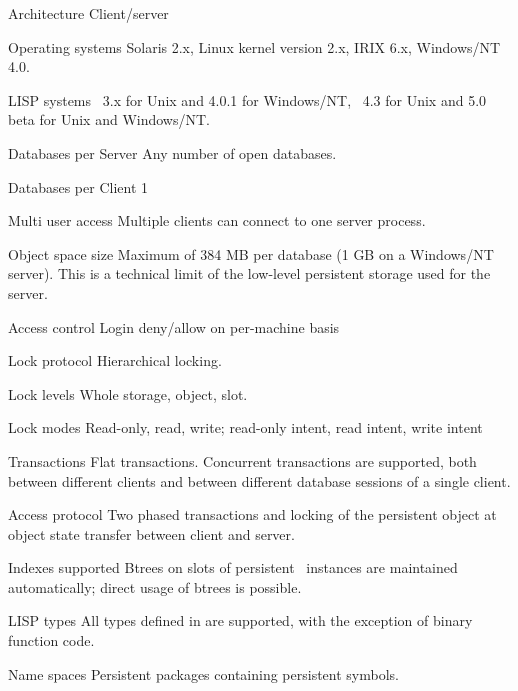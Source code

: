 %
\begin{deflist}[XXXXXXXXXXXXXXX]

\item[Architecture] Client/server

\item[Operating systems] Solaris 2.x, Linux kernel version 2.x, IRIX
  6.x, Windows/NT 4.0.

\item[LISP systems]
  \href{http://www.harlequin.co.uk/products/ads/lispworks/lispworks.html}{\lwcl}\ 
  3.x for Unix and 4.0.1 for Windows/NT,
  \href{http://www.franz.com/products/products.html}{\allegrocl}\ 4.3
  for Unix and 5.0 beta for Unix and Windows/NT.

\item[Databases per Server] Any number of open databases.

\item[Databases per Client] 1

\item[Multi user access] Multiple clients can connect to one server
  process.

\item[Object space size] Maximum of 384 MB per database (1 GB on a
  Windows/NT server). This is a technical limit of the low-level
  persistent storage used for the server.

\item[Access control] Login deny/allow on per-machine basis

\item[Lock protocol] Hierarchical locking.

\item[Lock levels] Whole storage, object, slot.

\item[Lock modes] Read-only, read, write; read-only intent, read
  intent, write intent

\item[Transactions] Flat transactions. Concurrent transactions are
  supported, both between different clients and between different
  database sessions of a single client.

\item[Access protocol] Two phased transactions and locking of the
  persistent object at object state transfer between client and
  server.

\item[Indexes supported] Btrees on slots of persistent \clos\ 
  instances are maintained automatically; direct usage of btrees is
  possible.

\item[LISP types] All types defined in \cite{bib:CLtLII} are
  supported, with the exception of binary function code.

\item[Name spaces] Persistent packages containing persistent symbols.

\end{deflist}
